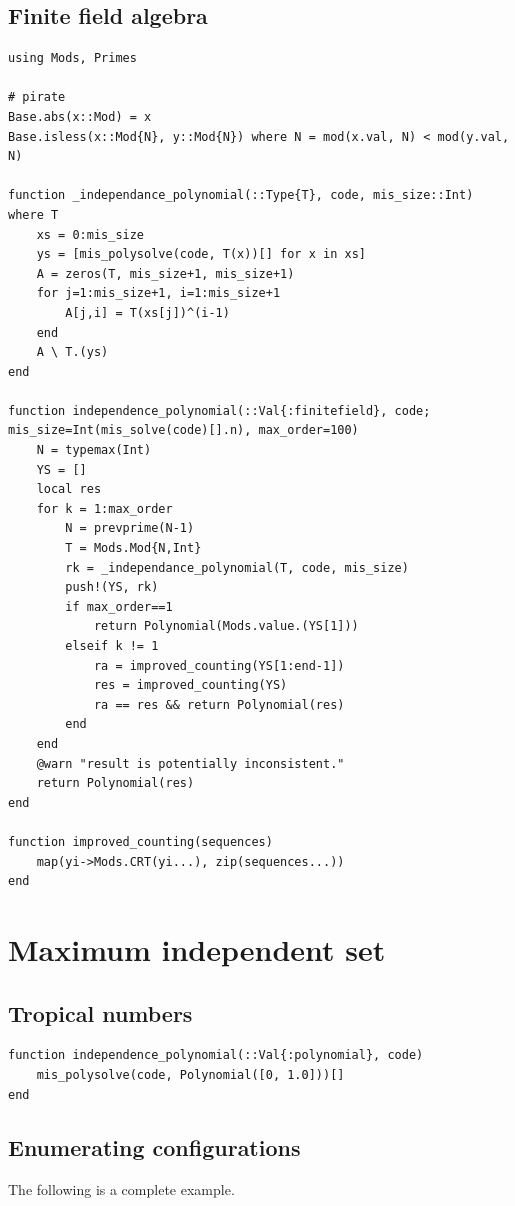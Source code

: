 \documentclass{article}
\newcommand{\<}{\langle}
\renewcommand{\>}{\rangle}
\theoremstyle{definition}\newtheorem{definition}{\textit{Definition}}
\begin{document}
\subsection{Finite field algebra}
\begin{lstlisting}
using Mods, Primes

# pirate
Base.abs(x::Mod) = x
Base.isless(x::Mod{N}, y::Mod{N}) where N = mod(x.val, N) < mod(y.val, N)

function _independance_polynomial(::Type{T}, code, mis_size::Int) where T
	xs = 0:mis_size
	ys = [mis_polysolve(code, T(x))[] for x in xs]
	A = zeros(T, mis_size+1, mis_size+1)
	for j=1:mis_size+1, i=1:mis_size+1
		A[j,i] = T(xs[j])^(i-1)
	end
	A \ T.(ys)
end

function independence_polynomial(::Val{:finitefield}, code; mis_size=Int(mis_solve(code)[].n), max_order=100)
    N = typemax(Int)
    YS = []
    local res
    for k = 1:max_order
	    N = prevprime(N-1)
        T = Mods.Mod{N,Int}
        rk = _independance_polynomial(T, code, mis_size)
        push!(YS, rk)
        if max_order==1
            return Polynomial(Mods.value.(YS[1]))
        elseif k != 1
            ra = improved_counting(YS[1:end-1])
            res = improved_counting(YS)
            ra == res && return Polynomial(res)
        end
    end
    @warn "result is potentially inconsistent."
    return Polynomial(res)
end

function improved_counting(sequences)
    map(yi->Mods.CRT(yi...), zip(sequences...))
end
\end{lstlisting}

\section{Maximum independent set}
\subsection{Tropical numbers}
\begin{lstlisting}
function independence_polynomial(::Val{:polynomial}, code)
    mis_polysolve(code, Polynomial([0, 1.0]))[]
end
\end{lstlisting}

\subsection{Enumerating configurations}

The following is a complete example.
\end{document}
